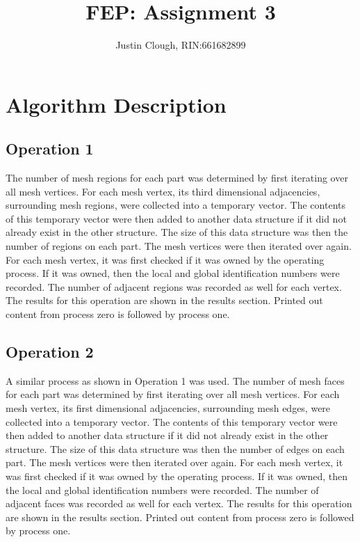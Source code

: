 \documentclass[a4paper, 12pt]{article}
\author{Justin Clough, RIN:661682899}
\title{FEP: Assignment 3}
\begin{document}
\maketitle

\section*{Algorithm Description}

\subsection*{Operation 1} \label{sec:sub:op1}

The number of mesh regions for each part was determined by 
first iterating over all mesh vertices. For each mesh vertex, 
its third dimensional adjacencies, surrounding mesh regions, were 
collected into a temporary vector. The contents of this temporary 
vector were then added to another data structure if it did not 
already exist in the other structure. The size of this data 
structure was then the number of regions on each part. The mesh
vertices were then iterated over again. For each mesh vertex, 
it was first checked if it was owned by the operating process. 
If it was owned, then the local and global identification numbers 
were recorded. The number of adjacent regions was recorded as well 
for each vertex. The results for this operation are shown in the
results section. Printed out content from process zero is followed
by process one.

\subsection*{Operation 2} \label{sec:sub:op2}

A similar process as shown in Operation 1 was used. The number of
mesh faces for each part was determined by first iterating over all mesh
vertices. For each mesh vertex, 
its first dimensional adjacencies, surrounding mesh edges, were 
collected into a temporary vector. The contents of this temporary 
vector were then added to another data structure if it did not 
already exist in the other structure. The size of this data 
structure was then the number of edges on each part. The mesh
vertices were then iterated over again. For each mesh vertex, 
it was first checked if it was owned by the operating process. 
If it was owned, then the local and global identification numbers 
were recorded. The number of adjacent faces was recorded as well 
for each vertex. The results for this operation are shown in the
results section.
Printed out content from process zero is followed
by process one.
\end{document}
